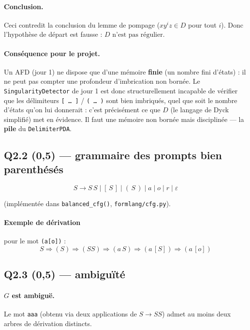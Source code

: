 \documentclass[11pt,a4paper]{scrartcl}
\begin{document}
\paragraph{Conclusion.} Ceci contredit la conclusion du lemme de pompage
($xy^iz\in D$ pour tout $i$). Donc l'hypothèse de départ est fausse :
$\boxed{D \text{ n'est pas régulier.}}$

\paragraph{Conséquence pour le projet.} Un AFD (jour 1) ne dispose que d'une mémoire
\textbf{finie} (un nombre fini d'états) : il ne peut pas compter une profondeur
d'imbrication non bornée. Le \texttt{SingularityDetector} de jour 1 est donc
structurellement incapable de vérifier que les délimiteurs \texttt{[\,\dots\,]} /
\texttt{(\,\dots\,)} sont bien imbriqués, quel que soit le nombre d'états qu'on lui
donnerait : c'est précisément ce que $D$ (le langage de Dyck simplifié) met en évidence.
Il faut une mémoire non bornée mais disciplinée — la \textbf{pile} du \texttt{DelimiterPDA}.

\subsection*{Q2.2 (0,5) — grammaire des prompts bien parenthésés}

$$S \rightarrow S\,S \mid [\,S\,] \mid (\,S\,) \mid a \mid o \mid r \mid \varepsilon$$

\noindent (implémentée dans \texttt{balanced\_cfg()}, \texttt{formlang/cfg.py}).

\paragraph{Exemple de dérivation} pour le mot \texttt{(a[o])} :
$$S \Rightarrow (S) \Rightarrow (SS) \Rightarrow (a\,S) \Rightarrow (a\,[S]) \Rightarrow (a\,[o])$$

\subsection*{Q2.3 (0,5) — ambiguïté}

\paragraph{$G$ est ambiguë.} Le mot \texttt{aaa} (obtenu via deux applications de
$S\to SS$) admet au moins deux arbres de dérivation distincts.
\end{document}
